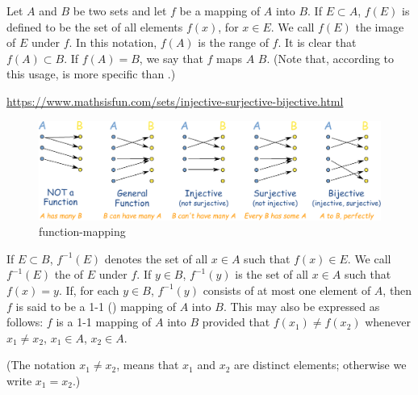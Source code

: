 \begin{mydef}
    \label{mydef:2.2}
    Let $A$ and $B$ be two sets and let $f$ be a mapping of $A$ into $B$.
    If $E \subset A$, $f(E)$ is defined to be the set of all elements $f(x)$, for $x \in E$. We call $f(E)$ the image of $E$ under $f$. In this notation, $f(A)$ is the range of $f$. It is clear that $f(A) \subset B$. If $f(A) = B$, we say that $f$ maps $A$  $B$. (Note that, according
    to this usage,  is more specific than .)

    \url{https://www.mathsisfun.com/sets/injective-surjective-bijective.html}
    \begin{figure}[htbp]
        \centering
        \includegraphics[width=0.7\linewidth]{pic/function-mapping.pdf}
        \caption{function-mapping}
        \label{fig:function-mapping}
    \end{figure}

    If $E \subset B$, $f^{-1}(E)$ denotes the set of all $x \in A$ such that $f(x)\in E$. We call $f^{-1}(E)$ the  of $E$ under $f$. If $y \in B$, $f^{-1}(y)$ is the set of all $x \in A$ such that $f(x) =y$. If, for each $y\in B$, $f^{-1}(y)$ consists of at most one element of $A$, then $f$ is said to be a 1-1 () mapping of $A$ into $B$. This may also be expressed as follows: $f$ is a 1-1 mapping of $A$ into $B$ provided that $f(x_1) \neq f(x_2)$ whenever $x_1 \neq x_2$, $x_1 \in A$, $x_2 \in A$.

    (The notation $x_1 \neq x_2$, means that $x_1$ and $x_2$ are distinct elements; otherwise we write $x_1 = x_2$.)
\end{mydef}


